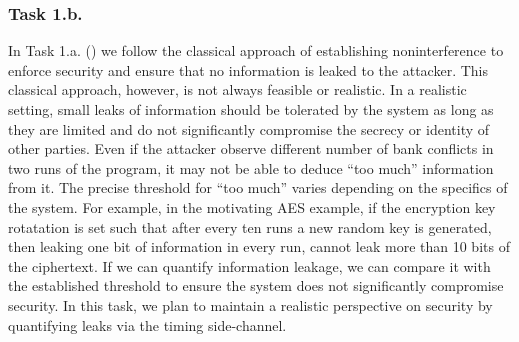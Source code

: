 \subsubsection{Task 1.b.}
In Task 1.a. () we follow the classical approach of establishing noninterference to enforce security and ensure that no information is leaked to the attacker. This classical approach, however, is not always feasible or realistic. 
%
In a realistic setting, small leaks of information should be tolerated by the system as long as they are limited and do not significantly compromise the secrecy or identity of other parties.
% 
%
Even if the attacker observe different number of bank conflicts in two runs of the program, it may not be able to deduce ``too much'' information from it. 
%
The precise threshold for “too much'' varies depending on the specifics of the system. 
%
For example, in the motivating AES example, if the encryption key rotatation is set such that after every ten runs a new random key is generated, then leaking one bit of information in every run, cannot leak more than 10 bits of the ciphertext.
%
If we can quantify information leakage, we can compare it with the established threshold to ensure the system does not significantly compromise security.
%
In this task, we plan to maintain a realistic perspective on security by quantifying leaks via the timing side-channel.

